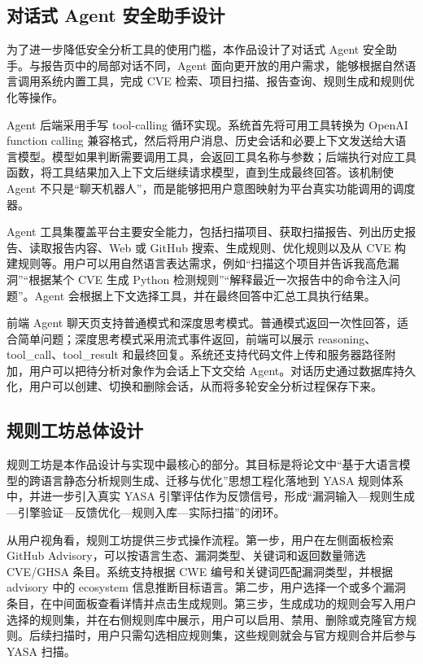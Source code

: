 \documentclass[a4paper,12pt,UTF8]{ctexart}
\numberwithin{figure}{section}
\numberwithin{table}{section}
\numberwithin{equation}{section}
\begin{document}
\subsection{对话式 Agent 安全助手设计}

{\songti
为了进一步降低安全分析工具的使用门槛，本作品设计了对话式 Agent 安全助手。与报告页中的局部对话不同，Agent 面向更开放的用户需求，能够根据自然语言调用系统内置工具，完成 CVE 检索、项目扫描、报告查询、规则生成和规则优化等操作。

Agent 后端采用手写 tool-calling 循环实现。系统首先将可用工具转换为 OpenAI function calling 兼容格式，然后将用户消息、历史会话和必要上下文发送给大语言模型。模型如果判断需要调用工具，会返回工具名称与参数；后端执行对应工具函数，将工具结果加入上下文后继续请求模型，直到生成最终回答。该机制使 Agent 不只是“聊天机器人”，而是能够把用户意图映射为平台真实功能调用的调度器。

Agent 工具集覆盖平台主要安全能力，包括扫描项目、获取扫描报告、列出历史报告、读取报告内容、Web 或 GitHub 搜索、生成规则、优化规则以及从 CVE 构建规则等。用户可以用自然语言表达需求，例如“扫描这个项目并告诉我高危漏洞”“根据某个 CVE 生成 Python 检测规则”“解释最近一次报告中的命令注入问题”。Agent 会根据上下文选择工具，并在最终回答中汇总工具执行结果。

前端 Agent 聊天页支持普通模式和深度思考模式。普通模式返回一次性回答，适合简单问题；深度思考模式采用流式事件返回，前端可以展示 reasoning、tool\_call、tool\_result 和最终回复。系统还支持代码文件上传和服务器路径附加，用户可以把待分析对象作为会话上下文交给 Agent。对话历史通过数据库持久化，用户可以创建、切换和删除会话，从而将多轮安全分析过程保存下来。
\par}

\subsection{规则工坊总体设计}

{\songti
规则工坊是本作品设计与实现中最核心的部分。其目标是将论文中“基于大语言模型的跨语言静态分析规则生成、迁移与优化”思想工程化落地到 YASA 规则体系中，并进一步引入真实 YASA 引擎评估作为反馈信号，形成“漏洞输入—规则生成—引擎验证—反馈优化—规则入库—实际扫描”的闭环。

从用户视角看，规则工坊提供三步式操作流程。第一步，用户在左侧面板检索 GitHub Advisory，可以按语言生态、漏洞类型、关键词和返回数量筛选 CVE/GHSA 条目。系统支持根据 CWE 编号和关键词匹配漏洞类型，并根据 advisory 中的 ecosystem 信息推断目标语言。第二步，用户选择一个或多个漏洞条目，在中间面板查看详情并点击生成规则。第三步，生成成功的规则会写入用户选择的规则集，并在右侧规则库中展示，用户可以启用、禁用、删除或克隆官方规则。后续扫描时，用户只需勾选相应规则集，这些规则就会与官方规则合并后参与 YASA 扫描。
\par}
\end{document}
